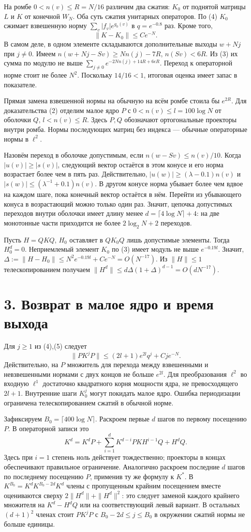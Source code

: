 \documentclass[11pt,a4paper]{article}
\newcommand{\sect}[1]{\section*{\sffamily\color{ink}#1}}
\begin{document}
На ромбе $0<n(v)\le R=N/16$ различим два сжатия: $K_0$ от поднятой матрицы $L$ и $K$ от конечной $W_N$. Оба суть сжатия унитарных операторов. По (4) $K_0$ сжимает взвешенную норму $\sum_v |f_v|e^{g_0(v)}$ в $q=e^{-0.8}$ раз. Кроме того,
\[
 \|K-K_0\|\le C e^{-N}.                                                  \tag{5}
\]
В самом деле, в одном элементе складываются дополнительные выходы $w+Nj$ при $j\ne0$. Имеем $n(w+Nj-Sv)\ge Nn(j)-7R$, $n(Sv)<6R$. Из (3) их сумма по модулю не выше $\sum_{j\ne0}e^{-2Nn(j)+14R+6\epsilon R}$. Переход к операторной норме стоит не более $N^2$. Поскольку $14/16<1$, итоговая оценка имеет запас в показателе.

Прямая замена взвешенной нормы на обычную на всём ромбе стоила бы $e^{2R}$. Для доказательства (2) отделим малое ядро $P$ с $0<n(v)\le l=100\log N$ от оболочки $Q$, $l<n(v)\le R$. Здесь $P,Q$ обозначают ортогональные проекторы внутри ромба. Нормы последующих матриц без индекса --- обычные операторные нормы в $\ell^2$.

Назовём переход в оболочке допустимым, если $n(w-Sv)\le n(v)/10$. Когда $|u(v)|\ge |s(v)|$, следующий вектор остаётся в этом конусе и его норма возрастает более чем в пять раз. Действительно, $|u(w)|\ge(\lambda-0.1)n(v)$ и $|s(w)|\le(\lambda^{-1}+0.1)n(v)$. В другом конусе норма убывает более чем вдвое на каждом шаге, пока конечный вектор остаётся в нём. Перейти из убывающего конуса в возрастающий можно только один раз. Значит, цепочка допустимых переходов внутри оболочки имеет длину менее $d=\lceil4\log N\rceil+4$: на две монотонные части приходится не более $2\log_2 N+2$ переходов.

Пусть $H=QKQ$, $H_0$ оставляет в $QK_0Q$ лишь допустимые элементы. Тогда $H_0^d=0$. Неприемлемый элемент $K_0$ по (3) имеет модуль не выше $e^{-0.19l}$. Значит, $\Delta:=\|H-H_0\|\le N^2e^{-0.19 l}+Ce^{-N}=O(N^{-17})$. Из $\|H\|\le1$ телескопированием получаем $\|H^d\|\le d\Delta(1+\Delta)^{d-1}=O(dN^{-17})$.
\newpage
\sect{3. Возврат в малое ядро и время выхода}
Для $j\ge1$ из (4),(5) следует
\[
 \|PK^jP\|\le (2l+1)e^{2l}q^j+Cj e^{-N}.                               \tag{6}
\]
Действительно, на $P$ множитель для перехода между взвешенными и невзвешенными нормами с двух концов не больше $e^{2l}$. Для преобразования $\ell^2$ во входную $\ell^1$ достаточно квадратного корня мощности ядра, не превосходящего $2l+1$. Внутренние шаги $K_0^j$ могут покидать малое ядро. Ошибка периодизации ограничена телескопированием сжатий в обычной норме.

Зафиксируем $B_0=\lceil400\log N\rceil$. Раскроем первые $d$ шагов по первому посещению $P$. В операторной записи это
\[
 K^d=K^d P+\sum_{i=1}^d K^{d-i}P K H^{i-1}Q+H^dQ .
\]
Здесь при $i=1$ степень ноль действует тождественно; проекторы в концах обеспечивают правильное ограничение. Аналогично раскроем последние $d$ шагов по последнему посещению $P$, применив ту же формулу к $K^*$. В $K^{B_0}=K^d K^{B_0-2d}K^d$ члены с пропущенным крайним посещением вместе оцениваются сверху $2\|H^d\|+\|H^d\|^2$: это следует заменой каждого крайнего множителя на $K^d-H^dQ$ или на соответствующий левый вариант. В остальных $(d+1)^2$ членах стоит $P K^jP$ с $B_0-2d\le j\le B_0$ в окружении сжатий нормы не больше единицы.
\end{document}
